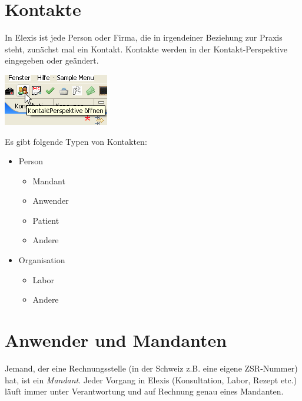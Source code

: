 
\section{Kontakte}
\label{kontakt}
In Elexis ist jede Person oder Firma, die in irgendeiner Beziehung zur Praxis
steht, zunächst mal ein \glqq Kontakt\grqq{}. Kontakte werden in der
Kontakt-Perspektive eingegeben oder geändert.
\begin{flushleft}
    \includegraphics{images/contactperspective}
\end{flushleft}


Es gibt folgende Typen von Kontakten:
\begin{itemize}
  \item Person
	\begin{itemize}
  		\item Mandant
  		\item Anwender
  		\item Patient
  		\item Andere
    \end{itemize}
    \item{Organisation}
    \begin{itemize}
      \item{Labor}
      \item {Andere}
    \end{itemize}
\end{itemize}


\section{Anwender und Mandanten}
Jemand, der eine Rechnungsstelle (in der Schweiz z.B. eine eigene ZSR-Nummer) hat, ist ein \textit{Mandant}. Jeder Vorgang in Elexis (Konsultation, Labor, Rezept etc.) läuft immer unter Verantwortung und auf Rechnung genau eines Mandanten. 

